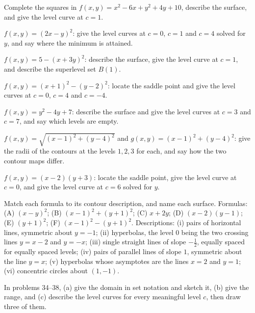 \begin{problems}[resume]
  \item Complete the squares in $f(x,y)=x^{2}-6x+y^{2}+4y+10$, describe the
        surface, and give the level curve at $c=1$.
  \item $f(x,y)=(2x-y)^{2}$: give the level curves at $c=0$, $c=1$ and
        $c=4$ solved for $y$, and say where the minimum is attained.
  \item $f(x,y)=5-(x+3y)^{2}$: describe the surface, give the level curve
        at $c=1$, and describe the superlevel set $B(1)$.
  \item $f(x,y)=(x+1)^{2}-(y-2)^{2}$: locate the saddle point and give the
        level curves at $c=0$, $c=4$ and $c=-4$.
  \item $f(x,y)=y^{2}-4y+7$: describe the surface and give the level curves
        at $c=3$ and $c=7$, and say which levels are empty.
  \item $f(x,y)=\sqrt{(x-1)^{2}+(y-4)^{2}}$ and
        $g(x,y)=(x-1)^{2}+(y-4)^{2}$: give the radii of the contours at the
        levels $1,2,3$ for each, and say how the two contour maps differ.
  \item $f(x,y)=(x-2)(y+3)$: locate the saddle point, give the level curve
        at $c=0$, and give the level curve at $c=6$ solved for $y$.
  \item Match each formula to its contour description, and name each
        surface. Formulas: (A) $(x-y)^{2}$; (B) $(x-1)^{2}+(y+1)^{2}$;
        (C) $x+2y$; (D) $(x-2)(y-1)$; (E) $(y+1)^{2}$;
        (F) $(x-1)^{2}-(y+1)^{2}$. Descriptions: (i) pairs of horizontal
        lines, symmetric about $y=-1$; (ii) hyperbolas, the level $0$ being
        the two crossing lines $y=x-2$ and $y=-x$; (iii) single straight
        lines of slope $-\tfrac12$, equally spaced for equally spaced
        levels; (iv) pairs of parallel lines of slope $1$, symmetric about
        the line $y=x$; (v) hyperbolas whose asymptotes are the lines $x=2$
        and $y=1$; (vi) concentric circles about $(1,-1)$.
\end{problems}

In problems 34--38, (a) give the domain in set notation and sketch it,
(b) give the range, and (c) describe the level curves for every meaningful
level $c$, then draw three of them.

